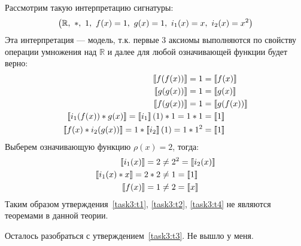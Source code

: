 \begin{solution}
Рассмотрим такую интерпретацию сигнатуры:
\[
	\left(  \mathbb{R},\ *,\ 1,\ f(x) = 1,\ g(x) = 1,\ i_1(x) = x,\ i_2(x) = x^2 \right)
\]
Эта интерпретация --- модель, т.к. первые 3 аксиомы выполняются по свойству операции умножения над $\mathbb{R}$ и далее для любой означивающей функции будет верно:
\begin{align*}
	\left\llbracket f(f(x)) \right\rrbracket  = 1 &= \left\llbracket f(x) \right\rrbracket  \\
	\left\llbracket g(g(x)) \right\rrbracket  = 1 &= \left\llbracket g(x) \right\rrbracket  \\
	\left\llbracket f(g(x)) \right\rrbracket  = 1 &= \left\llbracket g(f(x)) \right\rrbracket  \\
	\left\llbracket i_1(f(x)) * g(x) \right\rrbracket = \left\llbracket i_1 \right\rrbracket(1) * 1 = 1 * 1 & = \left\llbracket 1 \right\rrbracket \\
	\left\llbracket f(x) * i_2(g(x)) \right\rrbracket = 1 * \left\llbracket i_2 \right\rrbracket(1) = 1 * 1^2 &= \left\llbracket 1 \right\rrbracket
\end{align*}
Выберем означивающую функцию $\rho{(x)} = 2$, тогда:
\begin{align*}
	\left\llbracket i_1(x) \right\rrbracket = 2 &\neq 2^2 = \left\llbracket i_2(x) \right\rrbracket \\
	\left\llbracket i_1(x) * x \right\rrbracket = 2 * 2 &\neq 1 = \left\llbracket 1 \right\rrbracket \\
	\left\llbracket f(x) \right\rrbracket = 1 &\neq 2 = \left\llbracket x \right\rrbracket
\end{align*}
Таким образом утверждения~\ref{task3:t1}, \ref{task3:t2}, \ref{task3:t4} не являются теоремами в данной теории.


Осталось разобраться с утверждением~\ref{task3:t3}. Не вышло у меня.
\end{solution}

